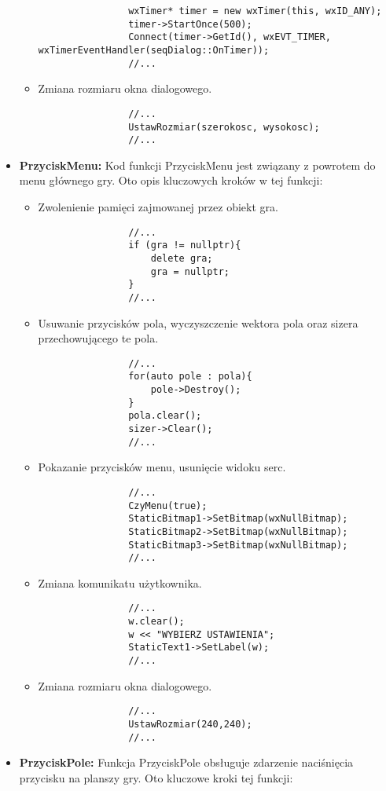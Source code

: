 \documentclass[]{report}
\begin{document}
\begin{itemize}
\begin{itemize}
\begin{lstlisting}
				wxTimer* timer = new wxTimer(this, wxID_ANY);
				timer->StartOnce(500);
				Connect(timer->GetId(), wxEVT_TIMER, wxTimerEventHandler(seqDialog::OnTimer));
				//...
			\end{lstlisting}
			\item Zmiana rozmiaru okna dialogowego.
			\begin{lstlisting}
				//...
				UstawRozmiar(szerokosc, wysokosc);
				//...
			\end{lstlisting}
		\end{itemize}
		\item \textbf{PrzyciskMenu:} Kod funkcji PrzyciskMenu jest związany z powrotem do menu głównego gry. Oto opis kluczowych kroków w tej funkcji:
		\begin{itemize}
			\item Zwolenienie pamięci zajmowanej przez obiekt gra. 
			\begin{lstlisting}
				//...
				if (gra != nullptr){
					delete gra;
					gra = nullptr;
				}
				//...
			\end{lstlisting}
			\item Usuwanie przycisków pola, wyczyszczenie wektora pola oraz sizera przechowującego te pola.
			\begin{lstlisting}
				//...
				for(auto pole : pola){
					pole->Destroy();
				}
				pola.clear();
				sizer->Clear();
				//...
			\end{lstlisting}
			\item Pokazanie przycisków menu, usunięcie widoku serc.
			\begin{lstlisting}
				//...
				CzyMenu(true);
				StaticBitmap1->SetBitmap(wxNullBitmap);
				StaticBitmap2->SetBitmap(wxNullBitmap);
				StaticBitmap3->SetBitmap(wxNullBitmap);
				//...
			\end{lstlisting}
			\item Zmiana komunikatu użytkownika.
			\begin{lstlisting}
				//...
				w.clear();
				w << "WYBIERZ USTAWIENIA";
				StaticText1->SetLabel(w);
				//...
			\end{lstlisting}
			\item Zmiana rozmiaru okna dialogowego.
			\begin{lstlisting}
				//...
				UstawRozmiar(240,240);
				//...
			\end{lstlisting}
		\end{itemize}
		\item \textbf{PrzyciskPole:} Funkcja PrzyciskPole obsługuje zdarzenie naciśnięcia przycisku na planszy gry. Oto kluczowe kroki tej funkcji:

\end{itemize}
\end{document}

